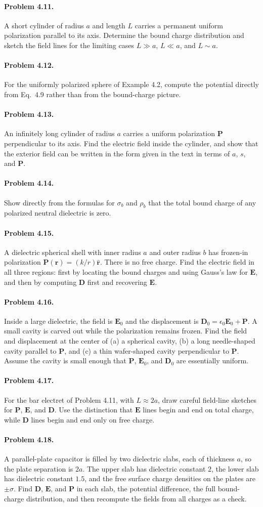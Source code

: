 \documentclass{aa}
\newcommand{\problemstatement}[2]{%
\paragraph{Problem #1.}#2\par\medskip
}
\begin{document}
\problemstatement{4.11}{A short cylinder of radius \(a\) and length \(L\) carries a permanent uniform polarization parallel to its axis. Determine the bound charge distribution and sketch the field lines for the limiting cases \(L\gg a\), \(L\ll a\), and \(L\sim a\).}
\problemstatement{4.12}{For the uniformly polarized sphere of Example 4.2, compute the potential directly from Eq.~4.9 rather than from the bound-charge picture.}
\problemstatement{4.13}{An infinitely long cylinder of radius \(a\) carries a uniform polarization \(\mathbf P\) perpendicular to its axis. Find the electric field inside the cylinder, and show that the exterior field can be written in the form given in the text in terms of \(a\), \(s\), and \(\mathbf P\).}
\problemstatement{4.14}{Show directly from the formulas for \(\sigma_b\) and \(\rho_b\) that the total bound charge of any polarized neutral dielectric is zero.}
\problemstatement{4.15}{A dielectric spherical shell with inner radius \(a\) and outer radius \(b\) has frozen-in polarization \(\mathbf P(\mathbf r)=(k/r)\hat{\mathbf r}\). There is no free charge. Find the electric field in all three regions: first by locating the bound charges and using Gauss's law for \(\mathbf E\), and then by computing \(\mathbf D\) first and recovering \(\mathbf E\).}
\problemstatement{4.16}{Inside a large dielectric, the field is \(\mathbf E_0\) and the displacement is \(\mathbf D_0=\epsilon_0\mathbf E_0+\mathbf P\). A small cavity is carved out while the polarization remains frozen. Find the field and displacement at the center of (a) a spherical cavity, (b) a long needle-shaped cavity parallel to \(\mathbf P\), and (c) a thin wafer-shaped cavity perpendicular to \(\mathbf P\). Assume the cavity is small enough that \(\mathbf P\), \(\mathbf E_0\), and \(\mathbf D_0\) are essentially uniform.}
\problemstatement{4.17}{For the bar electret of Problem 4.11, with \(L\approx 2a\), draw careful field-line sketches for \(\mathbf P\), \(\mathbf E\), and \(\mathbf D\). Use the distinction that \(\mathbf E\) lines begin and end on total charge, while \(\mathbf D\) lines begin and end only on free charge.}
\problemstatement{4.18}{A parallel-plate capacitor is filled by two dielectric slabs, each of thickness \(a\), so the plate separation is \(2a\). The upper slab has dielectric constant \(2\), the lower slab has dielectric constant \(1.5\), and the free surface charge densities on the plates are \(\pm\sigma\). Find \(\mathbf D\), \(\mathbf E\), and \(\mathbf P\) in each slab, the potential difference, the full bound-charge distribution, and then recompute the fields from all charges as a check.}
\end{document}
